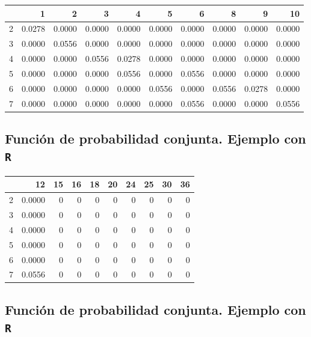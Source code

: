 \documentclass[]{book}
\begin{document}
\begin{tabular}{l|r|r|r|r|r|r|r|r|r}
\hline
  & 1 & 2 & 3 & 4 & 5 & 6 & 8 & 9 & 10\\
\hline
2 & 0.0278 & 0.0000 & 0.0000 & 0.0000 & 0.0000 & 0.0000 & 0.0000 & 0.0000 & 0.0000\\
\hline
3 & 0.0000 & 0.0556 & 0.0000 & 0.0000 & 0.0000 & 0.0000 & 0.0000 & 0.0000 & 0.0000\\
\hline
4 & 0.0000 & 0.0000 & 0.0556 & 0.0278 & 0.0000 & 0.0000 & 0.0000 & 0.0000 & 0.0000\\
\hline
5 & 0.0000 & 0.0000 & 0.0000 & 0.0556 & 0.0000 & 0.0556 & 0.0000 & 0.0000 & 0.0000\\
\hline
6 & 0.0000 & 0.0000 & 0.0000 & 0.0000 & 0.0556 & 0.0000 & 0.0556 & 0.0278 & 0.0000\\
\hline
7 & 0.0000 & 0.0000 & 0.0000 & 0.0000 & 0.0000 & 0.0556 & 0.0000 & 0.0000 & 0.0556\\
\hline
\end{tabular}

\hypertarget{funciuxf3n-de-probabilidad-conjunta.-ejemplo-con-r-5}{%
\subsection{\texorpdfstring{Función de probabilidad conjunta. Ejemplo con \texttt{R}}{Función de probabilidad conjunta. Ejemplo con R}}\label{funciuxf3n-de-probabilidad-conjunta.-ejemplo-con-r-5}}

\begin{tabular}{l|r|r|r|r|r|r|r|r|r}
\hline
  & 12 & 15 & 16 & 18 & 20 & 24 & 25 & 30 & 36\\
\hline
2 & 0.0000 & 0 & 0 & 0 & 0 & 0 & 0 & 0 & 0\\
\hline
3 & 0.0000 & 0 & 0 & 0 & 0 & 0 & 0 & 0 & 0\\
\hline
4 & 0.0000 & 0 & 0 & 0 & 0 & 0 & 0 & 0 & 0\\
\hline
5 & 0.0000 & 0 & 0 & 0 & 0 & 0 & 0 & 0 & 0\\
\hline
6 & 0.0000 & 0 & 0 & 0 & 0 & 0 & 0 & 0 & 0\\
\hline
7 & 0.0556 & 0 & 0 & 0 & 0 & 0 & 0 & 0 & 0\\
\hline
\end{tabular}

\hypertarget{funciuxf3n-de-probabilidad-conjunta.-ejemplo-con-r-6}{%
\subsection{\texorpdfstring{Función de probabilidad conjunta. Ejemplo con \texttt{R}}{Función de probabilidad conjunta. Ejemplo con R}}\label{funciuxf3n-de-probabilidad-conjunta.-ejemplo-con-r-6}}
\end{document}
